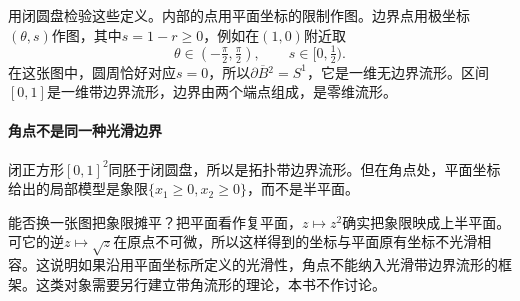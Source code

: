 用闭圆盘检验这些定义。内部的点用平面坐标的限制作图。边界点用极坐标$(\theta,s)$作图，其中$s=1-r\geq0$，例如在$(1,0)$附近取
\[
\theta\in(-\tfrac{\pi}{2},\tfrac{\pi}{2}),\qquad s\in[0,\tfrac12).
\]
在这张图中，圆周恰好对应$s=0$，所以$\partial\overline B{}^2=S^1$，它是一维无边界流形。区间$[0,1]$是一维带边界流形，边界由两个端点组成，是零维流形。

\paragraph{角点不是同一种光滑边界}
闭正方形$[0,1]^2$同胚于闭圆盘，所以是拓扑带边界流形。但在角点处，平面坐标给出的局部模型是象限$\{x_1\geq0,x_2\geq0\}$，而不是半平面。

能否换一张图把象限摊平？把平面看作复平面，$z\mapsto z^2$确实把象限映成上半平面。可它的逆$z\mapsto\sqrt z$在原点不可微，所以这样得到的坐标与平面原有坐标不光滑相容。这说明如果沿用平面坐标所定义的光滑性，角点不能纳入光滑带边界流形的框架。这类对象需要另行建立带角流形的理论，本书不作讨论。

